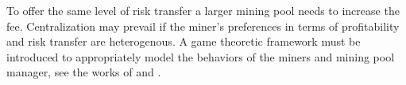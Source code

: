 To offer the same level of risk transfer a larger mining pool needs to increase the fee. Centralization may prevail if the miner's preferences in terms of profitability and risk transfer are heterogenous. A game theoretic framework must be introduced to appropriately model the behaviors of the miners and mining pool manager, see the works of \citet{li2019mean} and \citet{Cong2020}.
\newpage